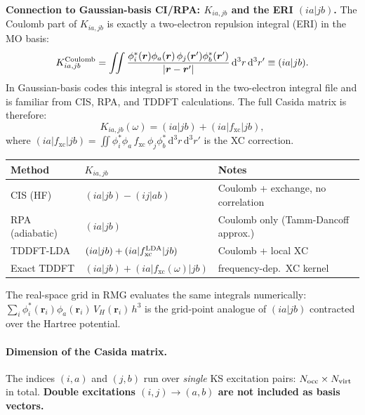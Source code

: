 \documentclass[12pt,letterpaper]{article}
\newcommand{\dd}{\mathrm{d}}
\newcommand{\fxc}{f_{\mathrm{xc}}}
\theoremstyle{definition}
\begin{document}
\begin{insight}
\textbf{Connection to Gaussian-basis CI/RPA: $K_{ia,jb}$ and the ERI $(ia|jb)$.}
The Coulomb part of $K_{ia,jb}$ is exactly a two-electron repulsion integral
(ERI) in the MO basis:
\begin{equation}
  K_{ia,jb}^{\rm Coulomb}
  = \iint\frac{\phi_i^*(\bm{r})\phi_a(\bm{r})\,
               \phi_j(\bm{r}')\phi_b^*(\bm{r}')}{|\bm{r}-\bm{r}'|}
    \,\dd^3r\,\dd^3r'
  \equiv (ia|jb).
  \label{eq:Kij_ERI}
\end{equation}
In Gaussian-basis codes this integral is stored in the two-electron integral
file and is familiar from CIS, RPA, and TDDFT calculations.
The full Casida matrix is therefore:
\begin{equation}
  K_{ia,jb}(\omega)
  = (ia|jb) + (ia|\fxc|jb),
  \label{eq:K_split}
\end{equation}
where $(ia|\fxc|jb) = \iint\phi_i^*\phi_a\,\fxc\,\phi_j\phi_b^*\,\dd^3r\,\dd^3r'$
is the XC correction.

\begin{center}
\renewcommand{\arraystretch}{1.3}
\begin{tabular}{@{}lll@{}}
\toprule
Method & $K_{ia,jb}$ & Notes \\
\midrule
CIS (HF) & $(ia|jb) - (ij|ab)$ & Coulomb + exchange, no correlation \\
RPA (adiabatic) & $(ia|jb)$ & Coulomb only (Tamm-Dancoff approx.) \\
TDDFT-LDA & $(ia|jb) + (ia|f_{\rm xc}^{\rm LDA}|jb)$ & Coulomb + local XC \\
Exact TDDFT & $(ia|jb) + (ia|\fxc(\omega)|jb)$ & frequency-dep.\ XC kernel \\
\bottomrule
\end{tabular}
\renewcommand{\arraystretch}{1}
\end{center}
The real-space grid in RMG evaluates the same integrals numerically:
$\sum_i \phi_i^*(\bm{r}_i)\phi_a(\bm{r}_i)\,V_H(\bm{r}_i)\,h^3$
is the grid-point analogue of $(ia|jb)$ contracted over the Hartree
potential.
\end{insight}

\paragraph{Dimension of the Casida matrix.}
The indices $(i,a)$ and $(j,b)$ run over \emph{single} KS
excitation pairs: $N_{\rm occ}\times N_{\rm virt}$ in total.
\textbf{Double excitations $(i,j)\to(a,b)$ are not included as
basis vectors.}
\end{document}
